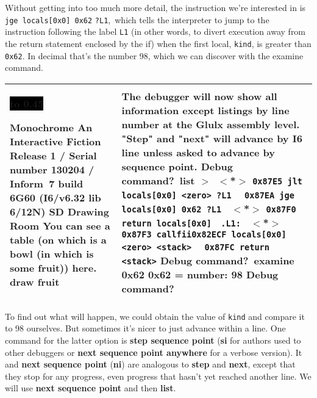 \documentclass{book}
\newcommand{\n}{\hspace*{\fill}\newline}
\newcommand{\terp}[2]{\begin{center}\begin{tabular}{p{0.45\textwidth}|p{0.45\textwidth}}\midrule #1&#2\\\midrule\end{tabular}\end{center}}
\newcommand{\glkheading}[1]{\textbf{#1}}
\newcommand{\glkinput}[1]{\textbf{#1}}
\newcommand{\glkstatusline}[2]{\centerline{\colorbox{black}{\hbox to 0.45\textwidth{\textcolor{white}{#1\hfil #2}}}}}
\newcommand{\storyprompt}{\raisebox{1.5pt}{\(>\)}}
\newcommand{\cursor}{\raisebox{-1.5pt}{\RectangleThin}}
\newcommand{\markeddip}{\(>\)\ }
\newcommand{\unmarkeddip}{\hphantom{\(>\)}\ }
\begin{document}
Without getting into too much more detail, the instruction we're interested in
is \lstinline{jge locals[0x0] 0x62} \hbox{\lstinline{?L1}, which} tells the
interpreter to jump to the instruction following the label \lstinline{L1} (in
other words, to divert execution away from the return statement enclosed by the
if) when the first local, \lstinline{kind}, is greater than \lstinline{0x62}.
In decimal that's the number 98, which we can discover with the examine command.

\terp{\glkstatusline{Drawing Room}{0/1}\n
  \glkheading{Monochrome}\n
  An Interactive Fiction\n
  Release 1 / Serial number 130204 / Inform~7 build 6G60 (I6/v6.32 lib 6/12N) SD\n
  \n
  \glkheading{Drawing Room}\n
  You can see a table (on which is a bowl (in which is some fruit)) here.\n
  \n
  \storyprompt\glkinput{draw fruit}}{%
  The debugger will now show all information except listings by line number at the Glulx assembly level.  "Step" and "next" will advance by I6 line unless asked to advance by sequence point.\n
  \n
  Debug command?\ \glkinput{list}\n
  \n
  \markeddip \(<\)*\(>\) \lstinline{0x87E5 jlt locals[0x0] <zero> ?L1}\n
  \unmarkeddip \hphantom{\(<\)*\(>\)} \lstinline{0x87EA jge locals[0x0] 0x62 ?L1}\n
  \unmarkeddip \(<\)*\(>\) \lstinline{0x87F0 return locals[0x0]}\n
  \unmarkeddip \lstinline{.L1:}\n
  \unmarkeddip \(<\)*\(>\) \lstinline @0x87F3 callfii@\hfill\lstinline @0x82ECF locals[0x0] <zero> <stack>@\n
  \unmarkeddip \hphantom{\(<\)*\(>\)} \lstinline{0x87FC return <stack>}\n
  \n
  Debug command?\ \glkinput{examine 0x62}\n
  \n
  0x62 = number: 98\n
  \n
  Debug command?\ \cursor}

To find out what will happen, we could obtain the value of \lstinline{kind} and
compare it to 98 ourselves.  But sometimes it's nicer to just advance within a
line.  One command for the latter option is \glkinput{step sequence point}
(\glkinput{si} for authors used to other debuggers or \glkinput{next sequence
  point anywhere} for a verbose version).  It and \glkinput{next sequence point}
(\glkinput{ni}) are analogous to \glkinput{step} and \glkinput{next}, except
that they stop for any progress, even progress that hasn't yet reached another
line.  We will use \glkinput{next sequence point} and then \glkinput{list}.
\end{document}
